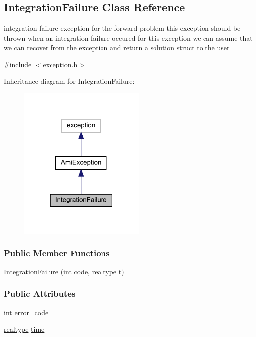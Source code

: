 \hypertarget{classamici_1_1_integration_failure}{}\subsection{Integration\+Failure Class Reference}
\label{classamici_1_1_integration_failure}


integration failure exception for the forward problem this exception should be thrown when an integration failure occured for this exception we can assume that we can recover from the exception and return a solution struct to the user  




{\ttfamily \#include $<$exception.\+h$>$}



Inheritance diagram for Integration\+Failure\+:
\nopagebreak
\begin{figure}[H]
\begin{center}
\leavevmode
\includegraphics[width=174pt]{classamici_1_1_integration_failure__inherit__graph}
\end{center}
\end{figure}
\subsubsection*{Public Member Functions}
\begin{DoxyCompactItemize}
\item 
\mbox{\hyperlink{classamici_1_1_integration_failure_a3e72353970444d949c15761bdcbc5e7f}{Integration\+Failure}} (int code, \mbox{\hyperlink{namespaceamici_a1bdce28051d6a53868f7ccbf5f2c14a3}{realtype}} t)
\end{DoxyCompactItemize}
\subsubsection*{Public Attributes}
\begin{DoxyCompactItemize}
\item 
int \mbox{\hyperlink{classamici_1_1_integration_failure_a7d16b1c68c87cec009d972e79abfba78}{error\+\_\+code}}
\item 
\mbox{\hyperlink{namespaceamici_a1bdce28051d6a53868f7ccbf5f2c14a3}{realtype}} \mbox{\hyperlink{classamici_1_1_integration_failure_a6dcdb92539544d894bdc153b3ba8bea6}{time}}
\end{DoxyCompactItemize}


